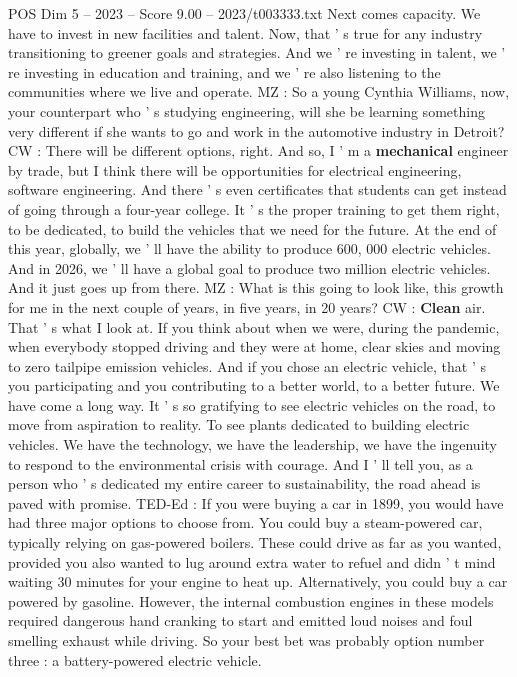 \begin{textsample}{POS Dim 5 – 2023 – Score 9.00 – 2023/t003333.txt}
Next comes capacity.
We have to invest in new facilities and talent.
Now, that ' s true for any industry transitioning to greener goals and strategies.
And we ' re investing in talent, we ' re investing in education and training, and we ' re also listening to the communities where we live and operate.
MZ : So a young Cynthia Williams, now, your counterpart who ' s studying engineering, will she be learning something very different if she wants to go and work in the automotive industry in Detroit?
CW : There will be different options, right.
And so, I ' m a \textbf{mechanical} engineer by trade, but I think there will be opportunities for electrical engineering, software engineering.
And there ' s even certificates that students can get instead of going through a four-year college.
It ' s the proper training to get them right, to be dedicated, to build the vehicles that we need for the future.
At the end of this year, globally, we ' ll have the ability to produce 600, 000 electric vehicles.
And in 2026, we ' ll have a global goal to produce two million electric vehicles.
And it just goes up from there.
MZ : What is this going to look like, this growth for me in the next couple of years, in five years, in 20 years?
CW : \textbf{Clean} air.
That ' s what I look at.
If you think about when we were, during the pandemic, when everybody stopped driving and they were at home, clear skies and moving to zero tailpipe emission vehicles.
And if you chose an electric vehicle, that ' s you participating and you contributing to a better world, to a better future.
We have come a long way.
It ' s so gratifying to see electric vehicles on the road, to move from aspiration to reality.
To see plants dedicated to building electric vehicles.
We have the technology, we have the leadership, we have the ingenuity to respond to the environmental crisis with courage.
And I ' ll tell you, as a person who ' s dedicated my entire career to sustainability, the road ahead is paved with promise.
TED-Ed : If you were buying a car in 1899, you would have had three major options to choose from.
You could buy a steam-powered car, typically relying on gas-powered boilers.
These could drive as far as you wanted, provided you also wanted to lug around extra water to refuel and didn ' t mind waiting 30 minutes for your engine to heat up.
Alternatively, you could buy a car powered by gasoline.
However, the internal combustion engines in these models required dangerous hand cranking to start and emitted loud noises and foul smelling exhaust while driving.
So your best bet was probably option number three : a battery-powered electric vehicle.

\end{textsample}
